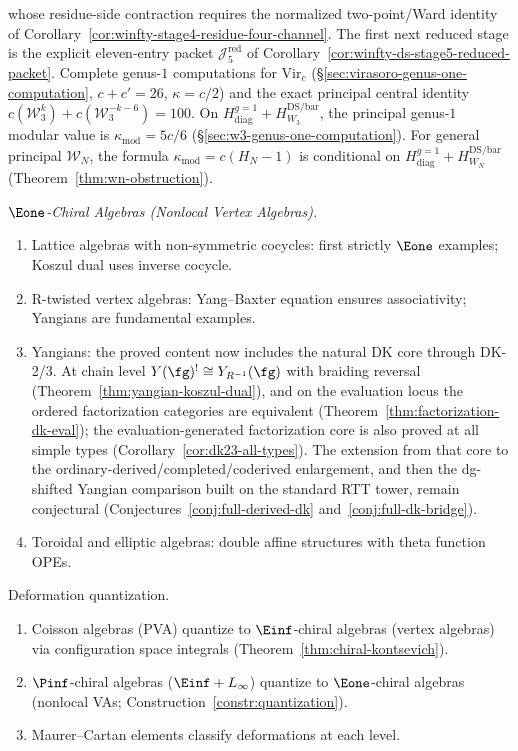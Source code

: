 \begin{enumerate}[label=(\roman*)]
whose residue-side contraction requires the normalized two-point/Ward
identity of Corollary~\ref{cor:winfty-stage4-residue-four-channel}. The
first next reduced stage is the explicit eleven-entry packet
$\mathcal{J}_5^{\mathrm{red}}$ of
Corollary~\ref{cor:winfty-ds-stage5-reduced-packet}.
Complete genus-$1$ computations for $\mathrm{Vir}_c$
(\S\ref{sec:virasoro-genus-one-computation}, $c + c' = 26$, $\kappa = c/2$)
and the exact principal central identity
$c(\mathcal W_3^k)+c(\mathcal W_3^{-k-6})=100$.  On
$H_{\mathrm{diag}}^{g=1}+H_{W_3}^{\mathrm{DS/bar}}$, the principal
genus-$1$ modular value is $\kappa_{\mathrm{mod}}=5c/6$
\textup{(}\S\ref{sec:w3-genus-one-computation}\textup{)}.
For general principal $\mathcal{W}_N$, the formula
$\kappa_{\mathrm{mod}}=c(H_N-1)$ is conditional on
$H_{\mathrm{diag}}^{g=1}+H_{W_N}^{\mathrm{DS/bar}}$
\textup{(}Theorem~\ref{thm:wn-obstruction}\textup{)}.
\end{enumerate}

\emph{$\Eone$-Chiral Algebras (Nonlocal Vertex Algebras).}
\begin{enumerate}[label=(\roman*)]
\item Lattice algebras with non-symmetric cocycles: first strictly $\Eone$ examples;
Koszul dual uses inverse cocycle.
\item R-twisted vertex algebras: Yang--Baxter equation ensures associativity;
Yangians are fundamental examples.
\item Yangians: the proved content now includes the natural DK core
 through DK-2/3. At chain level
 $Y(\fg)^! \cong Y_{R^{-1}}(\fg)$ with braiding reversal
 \textup{(}Theorem~\ref{thm:yangian-koszul-dual}\textup{)}, and on the
 evaluation locus the ordered factorization categories are equivalent
 \textup{(}Theorem~\ref{thm:factorization-dk-eval}\textup{)}; the
 evaluation-generated factorization core is also proved at all simple
 types \textup{(}Corollary~\ref{cor:dk23-all-types}\textup{)}. The
 extension from that core to the
 ordinary-derived/completed/coderived enlargement, and then the
 dg-shifted Yangian comparison built on the standard RTT tower,
 remain conjectural
 \textup{(}Conjectures~\ref{conj:full-derived-dk}
 and~\ref{conj:full-dk-bridge}\textup{)}.
\item Toroidal and elliptic algebras: double affine structures with theta function OPEs.
\end{enumerate}

Deformation quantization.
\begin{enumerate}[label=(\roman*)]
\item Coisson algebras (PVA) quantize to $\Einf$-chiral algebras (vertex algebras)
via configuration space integrals (Theorem~\ref{thm:chiral-kontsevich}).
\item $\Pinf$-chiral algebras ($\Einf + L_\infty$) quantize to $\Eone$-chiral
algebras (nonlocal VAs; Construction~\ref{constr:quantization}).
\item Maurer--Cartan elements classify deformations at each level.
\end{enumerate}

